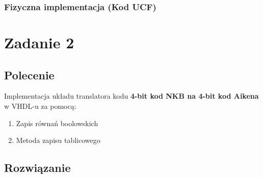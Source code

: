 \documentclass[a4paper,12pt]{extarticle}  %
\begin{document}
\subsubsection{Fizyczna implementacja (Kod UCF)}

\section{Zadanie 2}
\subsection{Polecenie}
Implementacja układu translatora kodu \textbf{4-bit kod NKB na 4-bit kod Aikena} w VHDL-u za pomocą:
\begin{enumerate}
	\item Zapis równań boolowskich
	\item Metoda zapisu tablicowego
\end{enumerate}
\subsection{Rozwiązanie}
\end{document}
